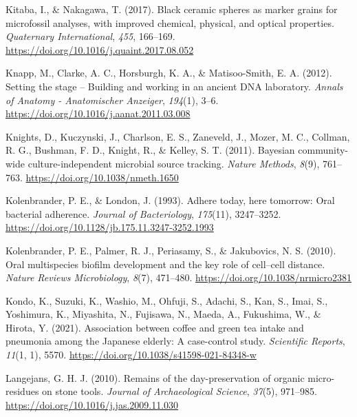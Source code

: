 \documentclass[
  letterpaper,
]{book}
\newlength{\cslhangindent}
\newlength{\cslentryspacingunit} %
\newenvironment{CSLReferences}[2] %
 {%
  \setlength{\parindent}{0pt}
  \ifodd #1
  \let\oldpar\par
  \def\par{\hangindent=\cslhangindent\oldpar}
  \fi
  \setlength{\parskip}{#2\cslentryspacingunit}
 }%
 {}
\begin{document}
\begin{CSLReferences}{1}{0}
\leavevmode{}%
Kitaba, I., \& Nakagawa, T. (2017). Black ceramic spheres as marker
grains for microfossil analyses, with improved chemical, physical, and
optical properties. \emph{Quaternary International}, \emph{455},
166--169. \url{https://doi.org/10.1016/j.quaint.2017.08.052}

\leavevmode{}%
Knapp, M., Clarke, A. C., Horsburgh, K. A., \& Matisoo-Smith, E. A.
(2012). Setting the stage -- {Building} and working in an ancient {DNA}
laboratory. \emph{Annals of Anatomy - Anatomischer Anzeiger},
\emph{194}(1), 3--6. \url{https://doi.org/10.1016/j.aanat.2011.03.008}

\leavevmode{}%
Knights, D., Kuczynski, J., Charlson, E. S., Zaneveld, J., Mozer, M. C.,
Collman, R. G., Bushman, F. D., Knight, R., \& Kelley, S. T. (2011).
Bayesian community-wide culture-independent microbial source tracking.
\emph{Nature Methods}, \emph{8}(9), 761--763.
\url{https://doi.org/10.1038/nmeth.1650}

\leavevmode{}%
Kolenbrander, P. E., \& London, J. (1993). Adhere today, here tomorrow:
Oral bacterial adherence. \emph{Journal of Bacteriology},
\emph{175}(11), 3247--3252.
\url{https://doi.org/10.1128/jb.175.11.3247-3252.1993}

\leavevmode{}%
Kolenbrander, P. E., Palmer, R. J., Periasamy, S., \& Jakubovics, N. S.
(2010). Oral multispecies biofilm development and the key role of
cell--cell distance. \emph{Nature Reviews Microbiology}, \emph{8}(7),
471--480. \url{https://doi.org/10.1038/nrmicro2381}

\leavevmode{}%
Kondo, K., Suzuki, K., Washio, M., Ohfuji, S., Adachi, S., Kan, S.,
Imai, S., Yoshimura, K., Miyashita, N., Fujisawa, N., Maeda, A.,
Fukushima, W., \& Hirota, Y. (2021). Association between coffee and
green tea intake and pneumonia among the {Japanese} elderly: A
case-control study. \emph{Scientific Reports}, \emph{11}(1, 1), 5570.
\url{https://doi.org/10.1038/s41598-021-84348-w}

\leavevmode{}%
Langejans, G. H. J. (2010). Remains of the day-preservation of organic
micro-residues on stone tools. \emph{Journal of Archaeological Science},
\emph{37}(5), 971--985. \url{https://doi.org/10.1016/j.jas.2009.11.030}


\end{CSLReferences}
\end{document}
